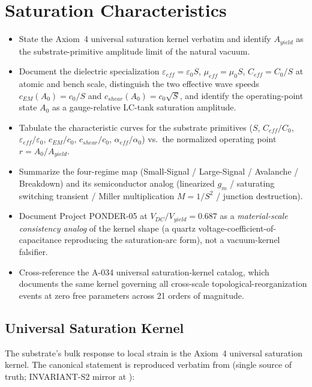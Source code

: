 \chapter{Saturation Characteristics}
\label{ch:vol9_saturation_characteristics}

\begin{objectivebox}
\begin{itemize}
    \item State the Axiom~4 universal saturation kernel verbatim and identify $A_{yield}$ as the substrate-primitive amplitude limit of the natural vacuum.
    \item Document the dielectric specialization $\varepsilon_{eff} = \varepsilon_0 S$, $\mu_{eff} = \mu_0 S$, $C_{eff} = C_0/S$ at atomic and bench scale, distinguish the two effective wave speeds $c_{EM}(A_0) = c_0/S$ and $c_{shear}(A_0) = c_0 \sqrt{S}$, and identify the operating-point state $A_0$ as a gauge-relative LC-tank saturation amplitude.
    \item Tabulate the characteristic curves for the substrate primitives ($S$, $C_{eff}/C_0$, $\varepsilon_{eff}/\varepsilon_0$, $c_{EM}/c_0$, $c_{shear}/c_0$, $\alpha_{eff}/\alpha_0$) vs.\ the normalized operating point $r = A_0/A_{yield}$.
    \item Summarize the four-regime map (Small-Signal / Large-Signal / Avalanche / Breakdown) and its semiconductor analog (linearized $g_m$ / saturating switching transient / Miller multiplication $M = 1/S^2$ / junction destruction).
    \item Document Project PONDER-05 at $V_{DC}/V_{yield} = 0.687$ as a \emph{material-scale consistency analog} of the kernel shape (a quartz voltage-coefficient-of-capacitance reproducing the saturation-arc form), not a vacuum-kernel falsifier.
    \item Cross-reference the A-034 universal saturation-kernel catalog, which documents the same kernel governing all cross-scale topological-reorganization events at zero free parameters across 21 orders of magnitude.
\end{itemize}
\end{objectivebox}

\section{Universal Saturation Kernel}
\label{sec:vol9_saturation_kernel}

The substrate's bulk response to local strain is the Axiom~4 universal saturation kernel. The canonical statement is reproduced verbatim from  (single source of truth; INVARIANT-S2 mirror at ):

